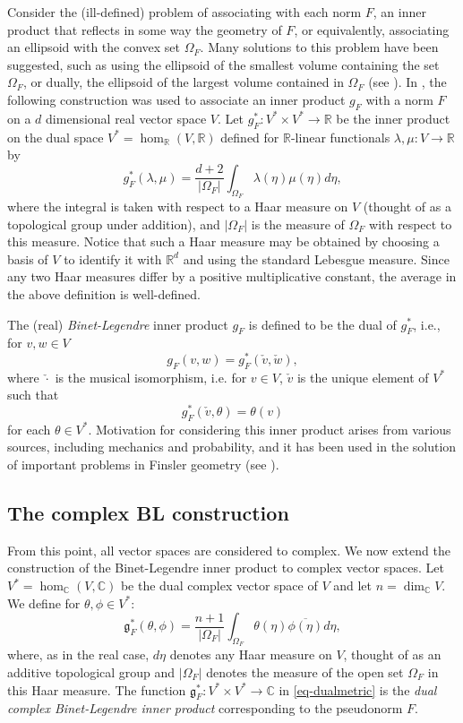 \documentclass[a4paper,11pt,reqno]{amsart}
\theoremstyle{plain}
\theoremstyle{definition}
\theoremstyle{remark}
\theoremstyle{remark}
\numberwithin{equation}{section}
\newcommand{\abs}[1]{\left\vert#1\right\vert}
\newcommand{\ol}{\overline}
\newcommand{\cx}{{\mathbb C}}
\newcommand{\rl}{\mathbb R}
\newcommand{\g}{\mathfrak{g}}
\begin{document}
Consider the (ill-defined) problem of associating with each norm $F$, an inner product that reflects in some way the geometry of $F$, or equivalently, associating an ellipsoid with the  
convex set $\Omega_F$. Many solutions to this problem have been 
suggested, such as using the ellipsoid of the smallest volume containing the set $\Omega_F$, or dually, the ellipsoid of the largest volume contained in $\Omega_F$ (see \cite{binet2}). 
In \cite{binet}, the following construction was used to associate 
an inner product $g_F$ with a norm $F$ on a $d$ dimensional real vector space $V$. Let $g_F^*:V^*\times V^*\to \rl$ be the inner product 
on the dual space $V^*=\hom_{\rl}(V,\rl)$ defined  for $\rl$-linear
functionals $\lambda, \mu : V\to \rl$ by
\[ g_F^*(\lambda, \mu)= \frac{d+2}{\abs{\Omega_F}}\int_{\Omega_F} \lambda(\eta)\mu(\eta)d\eta,\]
where the integral is taken with respect to a Haar measure on $V$ (thought of as a topological group under addition), and $\abs{\Omega_F}$ is the measure of $\Omega_F$ with respect to this measure. Notice that such a Haar measure may be obtained by choosing 
a basis of $V$ to identify it with $\rl^d$ and using the standard Lebesgue measure. Since any two Haar measures differ by a positive multiplicative constant, the average in the above definition is well-defined. 


The (real) \emph{Binet-Legendre} inner product $g_F$ is defined to be the dual of $g_F^*$, i.e., for $v,w\in V$
 \[ g_F(v,w)= g_F^*(\check{v}, \check{w}),\]
where $\check{\cdot}$ is the musical isomorphism, i.e. for $v\in V$, $\check{v}$ is the unique element of $V^*$ such that 
\[ g_F^*(\check{v}, \theta)=\theta(v)\]
for each $\theta\in V^*.$  Motivation for considering this inner product arises from various
sources, including mechanics and probability, and it has been used in the solution of important problems in
Finsler geometry (see \cite{binet}).

\subsection{ The complex BL construction}

\label{sec-binet} From this point, all vector spaces are considered to complex. We now extend the construction of the Binet-Legendre inner product to complex vector spaces.  Let $V^*= \hom_\cx(V,\cx)$ be the dual  complex vector space of $V$ and let $n=\dim_\cx V$. We define
for $\theta, \phi\in V^*$:
\begin{equation}
    \label{eq-dualmetric}
    \g_F^*(\theta, \phi)= \frac{n+1}{\abs{\Omega_F}}\int_{\Omega_F} \theta(\eta)\ol{\phi(\eta)}d \eta,
\end{equation}
where, as in the real case, $d\eta$ denotes any Haar measure on $V$, thought of as an additive topological group and $\abs{\Omega_F}$ denotes the measure of the open set $\Omega_F$ in this
Haar measure. 
The function $\g_F^*:V^*\times V^*\to \cx$ in \eqref{eq-dualmetric}  is the \emph{dual complex Binet-Legendre inner product} corresponding to the pseudonorm $F$.
\end{document}
